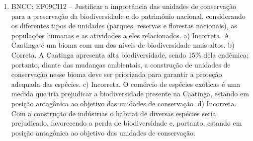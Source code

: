 \begin{enumerate}
\item
BNCC: EF09CI12 -- Justificar a importância das unidades de
conservação para a preservação da biodiversidade e do patrimônio
nacional, considerando os diferentes tipos de unidades (parques,
reservas e florestas nacionais), as populações humanas e as atividades a
eles relacionados.
a) Incorreta. A Caatinga é um bioma com um dos níveis de
  biodiversidade mais altos.
b) Correta. A Caatinga apresenta alta biodiversidade, sendo 15\% dela
  endêmica; portanto, diante das mudanças ambientais, a construção de
  unidades de conservação nesse bioma deve ser priorizada para garantir a proteção adequada das espécies.
c) Incorreta. O comércio de espécies exóticas é uma medida que iria
  prejudicar a biodiversidade presente na Caatinga, estando em posição
  antagônica ao objetivo das unidades de conservação.
d) Incorreta. Com a construção de indústrias o habitat de diversas
  espécies seria prejudicado, favorecendo a perda de biodiversidade e,
  portanto, estando em posição antagônica ao objetivo das unidades de conservação.
\end{enumerate}


